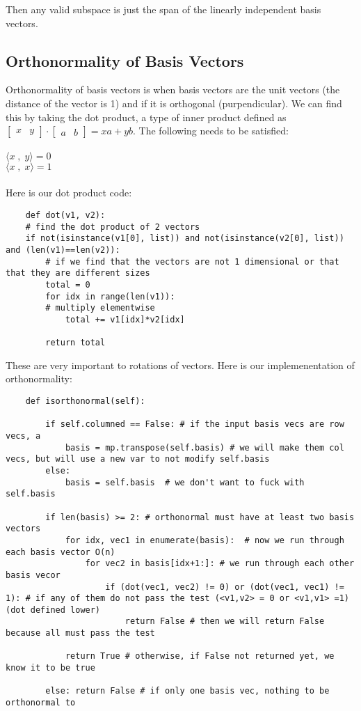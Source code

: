 \documentclass[12pt, a4paper]{article}
\begin{document}
Then any valid subspace is just the span of the linearly independent basis vectors.

\subsection{Orthonormality of Basis Vectors}

Orthonormality of basis vectors is when basis vectors are the unit vectors (the distance of the vector is 1) and if it is orthogonal (purpendicular).
We can find this by taking the dot product, a type of inner product defined as $\begin{bmatrix} x & y \end{bmatrix}  \cdot  \begin{bmatrix} a & b \end{bmatrix} = xa + yb$. 
The following needs to be satisfied: \\
\\
            $\langle x \; , \; y \rangle = 0$
            \\
            $\langle x \; , \; x \rangle = 1$
\\
\\
Here is our dot product code:
\begin{lstlisting}
    def dot(v1, v2):
    # find the dot product of 2 vectors
    if not(isinstance(v1[0], list)) and not(isinstance(v2[0], list)) and (len(v1)==len(v2)):
        # if we find that the vectors are not 1 dimensional or that that they are different sizes
        total = 0
        for idx in range(len(v1)):
        # multiply elementwise
            total += v1[idx]*v2[idx]
        
        return total
\end{lstlisting}

These are very important to rotations of vectors. 
Here is our implemenentation of orthonormality:
\begin{lstlisting}
    def isorthonormal(self): 

        if self.columned == False: # if the input basis vecs are row vecs, a
            basis = mp.transpose(self.basis) # we will make them col vecs, but will use a new var to not modify self.basis
        else:
            basis = self.basis  # we don't want to fuck with self.basis

        if len(basis) >= 2: # orthonormal must have at least two basis vectors
            for idx, vec1 in enumerate(basis):  # now we run through each basis vector O(n)
                for vec2 in basis[idx+1:]: # we run through each other basis vecor
                    if (dot(vec1, vec2) != 0) or (dot(vec1, vec1) != 1): # if any of them do not pass the test (<v1,v2> = 0 or <v1,v1> =1) (dot defined lower)
                        return False # then we will return False because all must pass the test
                
            return True # otherwise, if False not returned yet, we know it to be true
        
        else: return False # if only one basis vec, nothing to be orthonormal to
\end{lstlisting}
\end{document}
